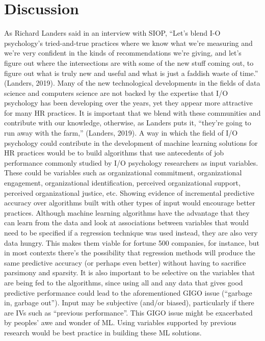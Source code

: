 \documentclass[
  jou]{apa6}
\begin{document}
\hypertarget{discussion}{%
\section{Discussion}\label{discussion}}

As Richard Landers said in an interview with SIOP, ``Let's blend I-O psychology's tried-and-true practices where we know what we're measuring and we're very confident in the kinds of recommendations we're giving, and let's figure out where the intersections are with some of the new stuff coming out, to figure out what is truly new and useful and what is just a faddish waste of time.'' (Landers, 2019).
Many of the new technological developments in the fields of data science and computers science are not backed by the expertise that I/O psychology has been developing over the years, yet they appear more attractive for many HR practices.
It is important that we blend with these communities and contribute with our knowledge, otherwise, as Landers puts it, ``they're going to run away with the farm,'' (Landers, 2019).
A way in which the field of I/O psychology could contribute in the development of machine learning solutions for HR practices would be to build algorithms that use antecedents of job performance commonly studied by I/O psychology researchers as input variables.
These could be variables such as organizational commitment, organizational engagement, organizational identification, perceived organizational support, perceived organizational justice, etc.
Showing evidence of incremental predictive accuracy over algorithms built with other types of input would encourage better practices.
Although machine learning algorithms have the advantage that they can learn from the data and look at associations between variables that would need to be specified if a regression technique was used instead, they are also very data hungry.
This makes them viable for fortune 500 companies, for instance, but in most contexts there's the possibility that regression methods will produce the same predictive accuracy (or perhaps even better) without having to sacrifice parsimony and sparsity.
It is also important to be selective on the variables that are being fed to the algorithms, since using all and any data that gives good predictive performance could lead to the aforementioned GIGO issue (``garbage in, garbage out'').
Input may be subjective (and/or biased), particularly if there are IVs such as ``previous performance''.
This GIGO issue might be exacerbated by peoples' awe and wonder of ML.
Using variables supported by previous research would be best practice in building these ML solutions.
\end{document}
